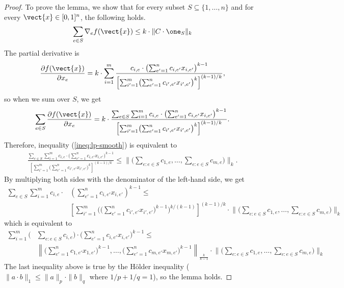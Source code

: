 \begin{proof}
To prove the lemma, we show that for every subset $S \subseteq \{1, \ldots, n\}$ and for every $\vect{x} \in [0,1]^{n}$, the following holds.
%
\begin{align}	\label{ineq:lp-smooth}
\sum_{e \in S} \nabla_{e} f(\vect{x}) \leq  k \cdot \|C \cdot \one_{S}\|_{k}
\end{align}
%
The partial derivative is
%
\begin{align*}
\frac{\partial f(\vect{x})}{\partial x_{e}}
= k \cdot \sum_{i = 1}^{m} \frac{c_{i,e} \cdot \bigl( \sum_{e' = 1}^{n} c_{i,e'} x_{i,e'} \bigr)^{k-1} }{ \left[ \sum_{i' = 1}^{m}
		\bigl( \sum_{e'= 1}^{n} c_{i',e'} x_{i',e'} \bigr)^{k} \right]^{(k-1)/k}},
\end{align*}
so when we sum over $S$, we get
\begin{align*}
\sum_{e \in S} \frac{\partial f(\vect{x})}{\partial x_{e}}
= k \cdot \frac{ \sum_{e \in S} \sum_{i = 1}^{m} c_{i,e} \cdot \bigl( \sum_{e' = 1}^{n} c_{i,e'} x_{i,e'} \bigr)^{k-1} }{ \left[ \sum_{i' = 1}^{m} \bigl( \sum_{e'= 1}^{n} c_{i',e'} x_{i',e'} \bigr)^{k} \right]^{(k-1)/k}}.
\end{align*}
%
Therefore, inequality (\ref{ineq:lp-smooth}) is equivalent to
\begin{align*}
\frac{ \sum_{e \in S} \sum_{i = 1}^{m} c_{i,e} \cdot \bigl( \sum_{e' = 1}^{n} c_{i,e'} x_{i,e'} \bigr)^{k-1} }{ \left[ \sum_{i' = 1}^{m} \bigl( \sum_{e'= 1}^{n} c_{i',e'} x_{i',e'} \bigr)^{k} \right]^{(k-1)/k}}
	\leq   \biggl \| \biggl( \sum_{e: e \in S} c_{1,e}, \ldots , \sum_{e: e \in S} c_{m,e}  \biggr) \biggr \|_{k}.
\end{align*}
%
By multiplying both sides with the denominator of the left-hand side, we get
%
\begin{align*}
    \sum_{e \in S} \sum_{i = 1}^{m} c_{i,e} \cdot & \left( \sum_{e' = 1}^{n} c_{i,e'} x_{i,e'} \right)^{k-1} \leq \\
    & \left[ \sum_{i'=1}^{m} \biggl( \biggl( \sum_{e'= 1}^{n} c_{i',e'} x_{i',e'} \biggr)^{k-1} \biggr)^{k/(k-1)} \right]^{(k-1)/k}
    	\cdot \biggl \| \biggl( \sum_{e: e \in S} c_{1,e}, \ldots , \sum_{e: e \in S} c_{m,e}  \biggr) \biggr \|_{k}
\end{align*}
which is equivalent to
\begin{align*}
    \sum_{i=1}^{m} \biggl( & \sum_{e: e \in S} c_{i,e} \biggr) \cdot \biggl( \sum_{e'=1}^{n} c_{i,e'} x_{i,e'} \biggr)^{k-1} \leq \\
    & \left \| \biggl( \sum_{e'=1}^{n} c_{1,e'} x_{1,e'} \biggr)^{k-1}, \ldots, \biggl( \sum_{e'=1}^{n} c_{m,e'} x_{m,e'} \biggr)^{k-1} \right \|_{\frac{k}{k-1}}
    		\cdot \biggl \| \biggl( \sum_{e: e \in S} c_{1,e}, \ldots , \sum_{e: e \in S} c_{m,e}  \biggr) \biggr \|_{k}
\end{align*}
The last inequality above is true by the H\"older inequality ($\| a \cdot b\|_{1} \leq \| a \|_{p} \cdot \| b \|_{q}$ where $1/p + 1/q = 1$), so the lemma holds.
\end{proof}


